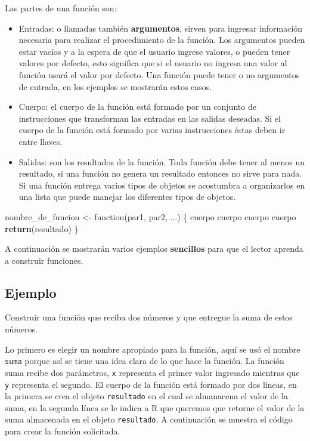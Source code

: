 \documentclass[10pt,]{krantz}
\makeatletter
\newenvironment{Shaded}{\begin{snugshade}}{\end{snugshade}}
\newcommand{\KeywordTok}[1]{\textcolor[rgb]{0.13,0.29,0.53}{\textbf{{#1}}}}
\newcommand{\StringTok}[1]{\textcolor[rgb]{0.31,0.60,0.02}{{#1}}}
\newcommand{\NormalTok}[1]{{#1}}
\providecommand{\tightlist}{%
  \setlength{\itemsep}{0pt}\setlength{\parskip}{0pt}}
\let\proglang=\textsf
\newenvironment{kframe}{%
\medskip{}
\setlength{\fboxsep}{.8em}
 \def\at@end@of@kframe{}%
 \ifinner\ifhmode%
  \def\at@end@of@kframe{\end{minipage}}%
  \begin{minipage}{\columnwidth}%
 \fi\fi%
 \def\FrameCommand##1{\hskip\@totalleftmargin \hskip-\fboxsep
 \colorbox{shadecolor}{##1}\hskip-\fboxsep
     \hskip-\linewidth \hskip-\@totalleftmargin \hskip\columnwidth}%
 \MakeFramed {\advance\hsize-\width
   \@totalleftmargin\z@ \linewidth\hsize
   \@setminipage}}%
 {\par\unskip\endMakeFramed%
 \at@end@of@kframe}
\renewenvironment{Shaded}{\begin{kframe}}{\end{kframe}}
\makeatother
\begin{document}
Las partes de una función son:

\begin{itemize}
\tightlist
\item
  Entradas: o llamadas también \textbf{argumentos}, sirven para ingresar
  información necesaria para realizar el procedimiento de la función.
  Los argumentos pueden estar vacíos y a la espera de que el usuario
  ingrese valores, o pueden tener valores por defecto, esto significa
  que si el usuario no ingresa una valor al función usará el valor por
  defecto. Una función puede tener o no argumentos de entrada, en los
  ejemplos se mostrarán estos casos.
\item
  Cuerpo: el cuerpo de la función está formado por un conjunto de
  instrucciones que transforman las entradas en las salidas deseadas. Si
  el cuerpo de la función está formado por varias instrucciones éstas
  deben ir entre llaves.
\item
  Salidas: son los resultados de la función. Toda función debe tener al
  menos un resultado, si una función no genera un resultado entonces no
  sirve para nada. Si una función entrega varios tipos de objetos se
  acostumbra a organizarlos en una lista que puede manejar los
  diferentes tipos de objetos.
\end{itemize}

\begin{Shaded}
\begin{Highlighting}[]
\NormalTok{nombre_de_funcion <-}\StringTok{ }\NormalTok{function(par1, par2, ...) \{}
  \NormalTok{cuerpo}
  \NormalTok{cuerpo}
  \NormalTok{cuerpo}
  \NormalTok{cuerpo}
  \KeywordTok{return}\NormalTok{(resultado)}
\NormalTok{\}}
\end{Highlighting}
\end{Shaded}

A continuación se mostrarán varios ejemplos \textbf{sencillos} para que
el lector aprenda a construir funciones.

\subsection*{Ejemplo}\label{ejemplo-20}


Construir una función que reciba dos números y que entregue la suma de
estos números.

Lo primero es elegir un nombre apropiado para la función, aquí se usó el
nombre \texttt{suma} porque así se tiene una idea clara de lo que hace
la función. La función suma recibe dos parámetros, \texttt{x} representa
el primer valor ingresado mientras que \texttt{y} representa el segundo.
El cuerpo de la función está formado por dos líneas, en la primera se
crea el objeto \texttt{resultado} en el cual se almanacena el valor de
la suma, en la segunda línea se le indica a \proglang{R} que queremos
que retorne el valor de la suma almacenada en el objeto
\texttt{resultado}. A continuación se muestra el código para crear la
función solicitada.
\end{document}
